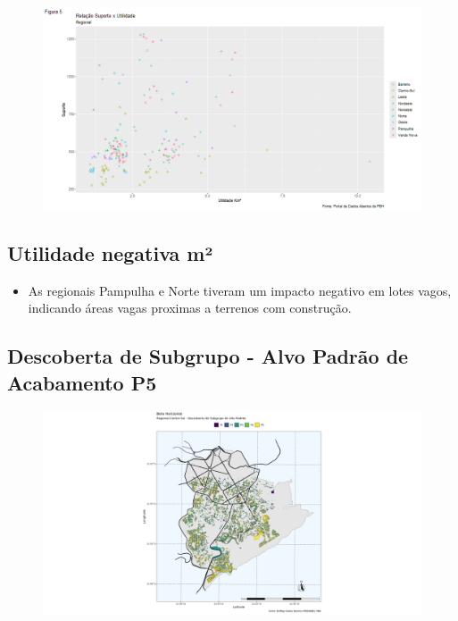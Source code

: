 \begin{frame}

    \begin{figure}[!htbp]
                \centering
       	    \includegraphics[scale=0.35]{imagens/utilidade_suporte.png}
            \end{figure}
\end{frame}

\subsection{Utilidade negativa m²}
\begin{frame}

    \begin{itemize}
    
        \item As regionais Pampulha e Norte tiveram um impacto negativo em lotes vagos, indicando áreas vagas proximas a terrenos com construção.
    \end{itemize}
\end{frame}

\subsection{Descoberta de Subgrupo - Alvo Padrão de Acabamento P5}
\begin{frame}

    \begin{figure}[!htbp]
                \centering
       	    \includegraphics[scale=0.26]{imagens/cortana3.png}
            \end{figure}
\end{frame}

